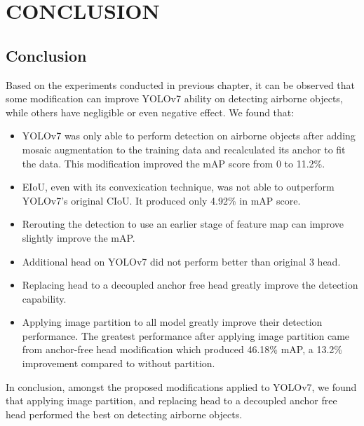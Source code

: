 \chapter{CONCLUSION}


\section{Conclusion}
\label{section:conclusion}

Based on the experiments conducted in previous chapter, it can be observed that some modification
can improve YOLOv7 ability on detecting airborne objects, while others have negligible or even negative effect.
We found that:
\begin{itemize}[noitemsep,topsep=0pt]
  \item YOLOv7 was only able to perform detection on airborne objects after adding mosaic augmentation to the training data and recalculated its anchor to fit the data.
  This modification improved the mAP score from 0 to 11.2\%.
  \item EIoU, even with its convexication technique, was not able to outperform YOLOv7's original CIoU. It produced only 4.92\% in mAP score.
  \item Rerouting the detection to use an earlier stage of feature map can improve slightly improve the mAP.
  \item Additional head on YOLOv7 did not perform better than original 3 head.
  \item Replacing head to a decoupled anchor free head greatly improve the detection capability.
  \item Applying image partition to all model greatly improve their detection performance. The greatest performance after applying image partition
  came from anchor-free head modification which produced 46.18\% mAP, a 13.2\% improvement compared to without partition.
\end{itemize}

In conclusion, amongst the proposed modifications applied to YOLOv7, we found that applying image partition, and replacing
head to a decoupled anchor free head performed the best on detecting airborne objects.



